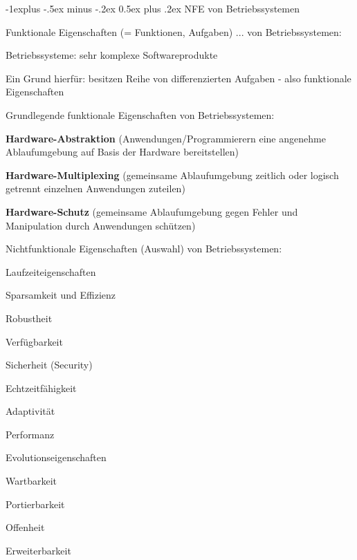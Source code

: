 \documentclass[a4paper]{article}
\makeatletter
\renewcommand{\subsection}{\@startsection{subsection}{2}{0mm}%
 {-1explus -.5ex minus -.2ex}%
 {0.5ex plus .2ex}%
 {\normalfont\normalsize\bfseries}}
\makeatother
\begin{document}
\begin{multicols}{3}
    \subsection{NFE von Betriebssystemen}

    Funktionale Eigenschaften (= Funktionen, Aufgaben) ... von
    Betriebssystemen:

    \begin{itemize*}
        \item
        Betriebssysteme: sehr komplexe Softwareprodukte
        \item
        Ein Grund hierfür: besitzen Reihe von differenzierten Aufgaben - also
        funktionale Eigenschaften
    \end{itemize*}

    Grundlegende funktionale Eigenschaften von Betriebssystemen:

    \begin{enumerate*}
        \item
        \textbf{Hardware-Abstraktion} (Anwendungen/Programmierern eine
        angenehme Ablaufumgebung auf Basis der Hardware bereitstellen)
        \item
        \textbf{Hardware-Multiplexing} (gemeinsame Ablaufumgebung zeitlich
        oder logisch getrennt einzelnen Anwendungen zuteilen)
        \item
        \textbf{Hardware-Schutz} (gemeinsame Ablaufumgebung gegen Fehler und
        Manipulation durch Anwendungen schützen)
    \end{enumerate*}

    Nichtfunktionale Eigenschaften (Auswahl) von Betriebssystemen:

    \begin{itemize*}
        \item
        Laufzeiteigenschaften
        \begin{itemize*}
            \item Sparsamkeit und Effizienz
            \item Robustheit
            \item Verfügbarkeit
            \item Sicherheit (Security)
            \item Echtzeitfähigkeit
            \item Adaptivität
            \item Performanz
        \end{itemize*}
        \item
        Evolutionseigenschaften
        \begin{itemize*}
            \item Wartbarkeit
            \item Portierbarkeit
            \item Offenheit
            \item Erweiterbarkeit
        \end{itemize*}
    \end{itemize*}


\end{multicols}
\end{document}
